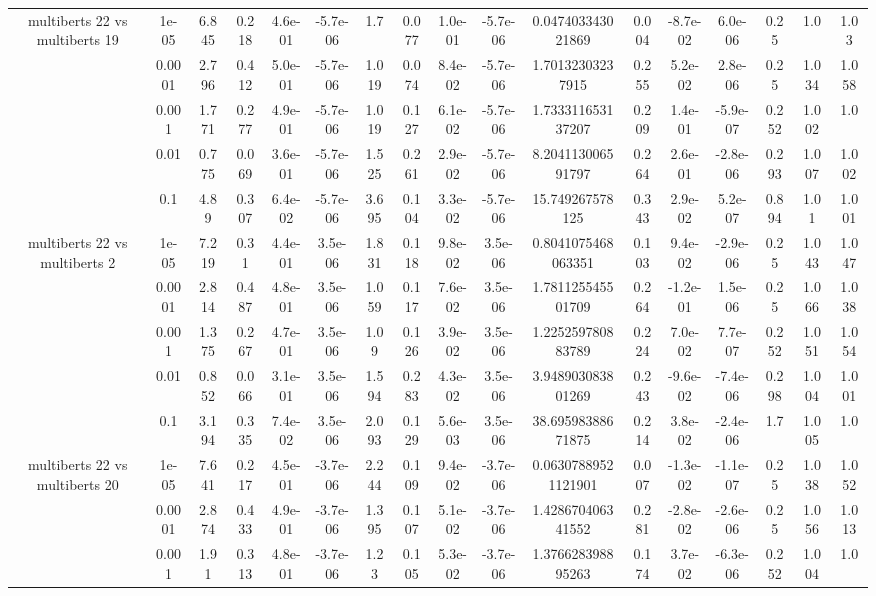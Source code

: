 \begin{tabular}{|c|c|c|c|c|c|c|c|c|c|c|c|c|c|c|c|c|}
\hline
\multirow{5}{*}{multiberts 22 vs multiberts 19} & 1e-05 & 6.845 & 0.218 & 4.6e-01 & -5.7e-06 & 1.7 & 0.077 & 1.0e-01 & -5.7e-06 & 0.047403343021869 & 0.004 & -8.7e-02 & 6.0e-06 & 0.25 & 1.0 & 1.03 \\
 & 0.0001 & 2.796 & 0.412 & 5.0e-01 & -5.7e-06 & 1.019 & 0.074 & 8.4e-02 & -5.7e-06 & 1.70132303237915 & 0.255 & 5.2e-02 & 2.8e-06 & 0.25 & 1.034 & 1.058 \\
 & 0.001 & 1.771 & 0.277 & 4.9e-01 & -5.7e-06 & 1.019 & 0.127 & 6.1e-02 & -5.7e-06 & 1.733311653137207 & 0.209 & 1.4e-01 & -5.9e-07 & 0.252 & 1.002 & 1.0 \\
 & 0.01 & 0.775 & 0.069 & 3.6e-01 & -5.7e-06 & 1.525 & 0.261 & 2.9e-02 & -5.7e-06 & 8.204113006591797 & 0.264 & 2.6e-01 & -2.8e-06 & 0.293 & 1.007 & 1.002 \\
 & 0.1 & 4.89 & 0.307 & 6.4e-02 & -5.7e-06 & 3.695 & 0.104 & 3.3e-02 & -5.7e-06 & 15.749267578125 & 0.343 & 2.9e-02 & 5.2e-07 & 0.894 & 1.01 & 1.001 \\
\hline
\multirow{5}{*}{multiberts 22 vs multiberts 2} & 1e-05 & 7.219 & 0.31 & 4.4e-01 & 3.5e-06 & 1.831 & 0.118 & 9.8e-02 & 3.5e-06 & 0.8041075468063351 & 0.103 & 9.4e-02 & -2.9e-06 & 0.25 & 1.043 & 1.047 \\
 & 0.0001 & 2.814 & 0.487 & 4.8e-01 & 3.5e-06 & 1.059 & 0.117 & 7.6e-02 & 3.5e-06 & 1.781125545501709 & 0.264 & -1.2e-01 & 1.5e-06 & 0.25 & 1.066 & 1.038 \\
 & 0.001 & 1.375 & 0.267 & 4.7e-01 & 3.5e-06 & 1.09 & 0.126 & 3.9e-02 & 3.5e-06 & 1.225259780883789 & 0.224 & 7.0e-02 & 7.7e-07 & 0.252 & 1.051 & 1.054 \\
 & 0.01 & 0.852 & 0.066 & 3.1e-01 & 3.5e-06 & 1.594 & 0.283 & 4.3e-02 & 3.5e-06 & 3.948903083801269 & 0.243 & -9.6e-02 & -7.4e-06 & 0.298 & 1.004 & 1.001 \\
 & 0.1 & 3.194 & 0.335 & 7.4e-02 & 3.5e-06 & 2.093 & 0.129 & 5.6e-03 & 3.5e-06 & 38.69598388671875 & 0.214 & 3.8e-02 & -2.4e-06 & 1.7 & 1.005 & 1.0 \\
\hline
\multirow{5}{*}{multiberts 22 vs multiberts 20} & 1e-05 & 7.641 & 0.217 & 4.5e-01 & -3.7e-06 & 2.244 & 0.109 & 9.4e-02 & -3.7e-06 & 0.06307889521121901 & 0.007 & -1.3e-02 & -1.1e-07 & 0.25 & 1.038 & 1.052 \\
 & 0.0001 & 2.874 & 0.433 & 4.9e-01 & -3.7e-06 & 1.395 & 0.107 & 5.1e-02 & -3.7e-06 & 1.428670406341552 & 0.281 & -2.8e-02 & -2.6e-06 & 0.25 & 1.056 & 1.013 \\
 & 0.001 & 1.91 & 0.313 & 4.8e-01 & -3.7e-06 & 1.23 & 0.105 & 5.3e-02 & -3.7e-06 & 1.376628398895263 & 0.174 & 3.7e-02 & -6.3e-06 & 0.252 & 1.004 & 1.0 \\

\end{tabular}
